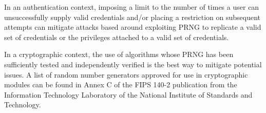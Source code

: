 In an authentication context, imposing a limit to the number of times a user can unsuccessfully supply valid credentials and/or placing a restriction on subsequent attempts can mitigate attacks based around exploiting PRNG to replicate a valid set of credentials or the privileges attached to a valid set of credentials.

In a cryptographic context, the use of algorithms whose PRNG has been sufficiently tested and independently verified is the best way to mitigate potential issues. A list of random number generators approved for use in cryptographic modules can be found in Annex C of the FIPS 140-2 publication from the Information Technology Laboratory of the National Institute of Standards and Technology.\autocite{20210517:annexc}

